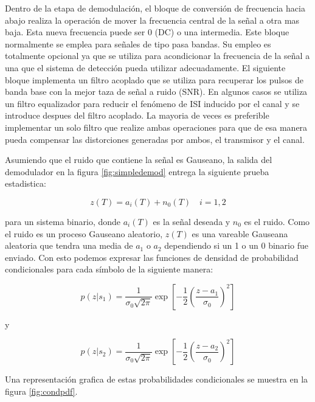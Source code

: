 Dentro de la etapa de demodulaci\'on, el bloque de conversi\'on de frecuencia hacia abajo
realiza la operaci\'on de mover la frecuencia central de la se\~nal a otra mas baja. Esta nueva
frecuencia puede ser 0 (DC) o una intermedia. Este bloque normalmente se emplea para se\~nales de
tipo pasa bandas. Su empleo es totalmente opcional ya que se utiliza para acondicionar la frecuencia
de la se\~nal a una que el sistema de detecci\'on pueda utilizar adecuadamente. El siguiente bloque
implementa un filtro acoplado que se utiliza para recuperar los pulsos de banda base con la mejor
taza de se\~nal a ruido (SNR). En algunos casos se utiliza un filtro equalizador para reducir el
fen\'omeno de ISI inducido por el canal y se introduce despues del filtro acoplado. La mayoria de
veces es preferible implementar un solo filtro que realize ambas operaciones para que de esa manera
pueda compensar las distorciones generadas por ambos, el transmisor y el canal.

Asumiendo que el ruido que contiene la se\~nal es Gauseano, la salida del demodulador en la figura
\ref{fig:simpledemod} entrega la siguiente prueba estadistica:

\begin{equation}
z(T)=a_i(T)+n_0(T) \quad i=1,2
\end{equation}

para un sistema binario, donde $a_i(T)$ es la se\~nal deseada y $n_0$ es el ruido. Como el ruido es
un proceso Gauseano aleatorio, $z(T)$ es una vareable Gauseana aleatoria que tendra una media de
$a_1$ o $a_2$ dependiendo si un 1 o un 0 binario fue enviado. Con esto podemos expresar las
funciones de densidad de probabilidad condicionales para cada s\'imbolo de la siguiente manera:

\begin{equation}
p(z|s_1)=\frac{1}{\sigma_0
\sqrt{2\pi}}\exp{\left[-\frac{1}{2}\left(\frac{z-a_1}{\sigma_0}\right)^2 \right]}
\end{equation}

y

\begin{equation}
p(z|s_2)=\frac{1}{\sigma_0
\sqrt{2\pi}}\exp{\left[-\frac{1}{2}\left(\frac{z-a_2}{\sigma_0}\right)^2 \right]}
\end{equation}

Una representaci\'on grafica de estas probabilidades condicionales se muestra en la figura
\ref{fig:condpdf}.

